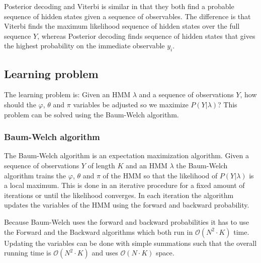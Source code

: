 

Posterior decoding and Viterbi is similar in that they both find a probable sequence of hidden states given a sequence of observables. The difference is that Viterbi finds the maximum likelihood sequence of hidden states over the full sequence $Y$, whereas Posterior decoding finds sequence of hidden states that gives the highest probability on the immediate observable $y_i$.

\subsection{Learning problem}

The learning problem is: Given an HMM $\lambda$ and a sequence of observations $Y$, how should the $\varphi$, $\theta$ and $\pi$ variables be adjusted so we maximize $P(Y|\lambda)$? This problem can be solved using the Baum-Welch algorithm.

\subsubsection{Baum-Welch algorithm}

The Baum-Welch \cite{Bishop} algorithm is an expectation maximization algorithm. Given a sequence of observations $Y$ of length $K$ and an HMM $\lambda$ the Baum-Welch algorithm trains the $\varphi$, $\theta$ and $\pi$ of the HMM so that the likelihood of $P(Y|\lambda)$ is a local maximum. This is done in an iterative procedure for a fixed amount of iterations or until the likelihood converges. In each iteration the algorithm updates the variables of the HMM using the forward and backward probability.

Because Baum-Welch uses the forward and backward probabilities it has to use the Forward and the Backward algorithms which both run in $\mathcal{O}( N ^2\cdot K)$ time. Updating the variables can be done with simple summations such that the overall running time is $\mathcal{O}( N ^2\cdot K)$ and uses $\mathcal{O}( N \cdot K)$ space.
